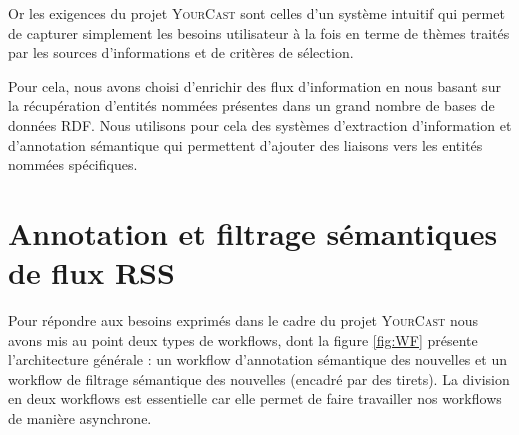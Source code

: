 \documentclass[]{easychair}
\newcommand{\comment}[4]{\par\noindent\hspace*{-0.5cm}{\parbox{\columnwidth}{\textbf{\color{#1}//#2[#3]:#4}}}\par}
\newcommand{\ch}[1]{\comment{green}{}{#1}{CH}}
\newcommand{\Y}[0]{\textsc{YourCast}\xspace}
\begin{document}
Or les exigences du  projet \Y sont celles d'un système intuitif qui permet de capturer simplement les besoins utilisateur à la fois en terme de thèmes traités par les sources d'informations et de critères de sélection. %

Pour cela, nous avons choisi d'enrichir des flux d'information en nous basant sur la récupération d'entités nommées présentes dans  un grand nombre de bases de données RDF. Nous utilisons pour cela des systèmes d'extraction d'information et d'annotation sémantique qui permettent d'ajouter des liaisons vers les entités nommées spécifiques.

%




\section{Annotation et filtrage sémantiques de flux RSS}
\label{sect:miseEnOuvre}
Pour répondre aux besoins exprimés dans le cadre du projet \Y nous avons mis au point deux types de workflows, dont la figure \ref{fig:WF} présente  l'architecture générale : un workflow d'annotation sémantique des nouvelles et un workflow de filtrage sémantique des nouvelles (encadré par des tirets). La division en deux workflows est essentielle car elle permet de faire travailler nos workflows de manière asynchrone.
\end{document}
